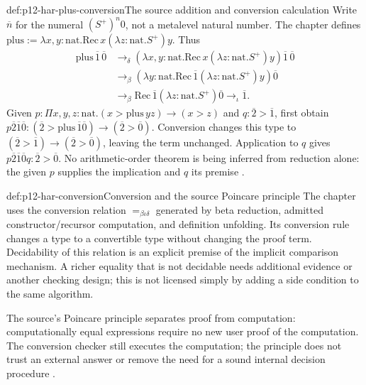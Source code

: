 \begin{hbexample}{def:p12-har-plus-conversion}{The source addition and conversion calculation}
Write \(\overline n\) for the numeral \((S^+)^n0\), not a
metalevel natural number. The chapter defines
\(\mathrm{plus}:=\lambda x,y:\mathrm{nat}.
\mathrm{Rec}\,x(\lambda z:\mathrm{nat}.S^+)y\). Thus
\[
\begin{aligned}
 \mathrm{plus}\,\overline1\,\overline0
 &\to_\delta
 (\lambda x,y:\mathrm{nat}.
   \mathrm{Rec}\,x(\lambda z:\mathrm{nat}.S^+)y)
       \overline1\,\overline0\\
 &\to_\beta(\lambda y:\mathrm{nat}.
   \mathrm{Rec}\,\overline1(\lambda z:\mathrm{nat}.S^+)y)\overline0\\
 &\to_\beta\mathrm{Rec}\,\overline1
             (\lambda z:\mathrm{nat}.S^+)\overline0
 \to_\iota\overline1.
\end{aligned}
\]
Given
\(p:\Pi x,y,z:\mathrm{nat}.(x>\mathrm{plus}\,y z)\to(x>z)\)
and \(q:\overline2>\overline1\), first obtain
\(p\overline2\overline1\overline0:
(\overline2>\mathrm{plus}\,\overline1\overline0)
\to(\overline2>\overline0)\). Conversion changes this type to
\((\overline2>\overline1)\to(\overline2>\overline0)\), leaving
the term unchanged. Application to \(q\) gives
\(p\overline2\overline1\overline0q:\overline2>\overline0\).
No arithmetic-order theorem is being inferred from reduction alone: the
given \(p\) supplies the implication and \(q\) its premise
\cite[pp.~1166--1167]{BarendregtGeuvers2001}.
\end{hbexample}

\begin{hbdefinition}{def:p12-har-conversion}{Conversion and the source Poincare principle}
The chapter uses the conversion relation \(=_{\beta\iota\delta}\)
generated by beta reduction, admitted constructor/recursor computation, and
definition unfolding. Its conversion rule changes a type to a convertible
type without changing the proof term. Decidability of this relation is an
explicit premise of the implicit comparison mechanism. A richer equality
that is not decidable needs additional evidence or another checking design;
this is not licensed simply by adding a side condition to the same algorithm.

The source's Poincare principle separates proof from computation:
computationally equal expressions require no new user proof of the
computation. The conversion checker still executes the computation; the
principle does not trust an external answer or remove the need for a sound
internal decision procedure \cite[pp.~1167--1168]{BarendregtGeuvers2001}.
\end{hbdefinition}

